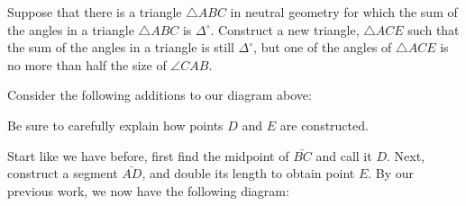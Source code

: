 \documentclass[instructornotes]{ximera}
\begin{document}
\begin{problem}\label{22} 
Suppose that there is a triangle $\triangle ABC$ in neutral geometry for
which the sum of the angles in a triangle $\triangle ABC$ is
$\Delta^\circ$. Construct a new triangle, $\triangle ACE$ such that
the sum of the angles in a triangle is still $\Delta^\circ$, but one
of the angles of $\triangle ACE$ is no more than half the size of
$\angle CAB$.
\begin{image}
\end{image}



\begin{hint} Consider the following additions to our diagram above:
\begin{image}
\end{image}
Be sure to carefully explain how points $D$ and $E$ are constructed.
\end{hint}
\begin{freeResponse}
Start like we have before, first find the midpoint of $\bar{BC}$ and
call it $D$. Next, construct a segment $\bar{AD}$, and double its
length to obtain point $E$. By our previous work, we now have the
following diagram:
\begin{image}
\end{image}
\end{freeResponse}
\end{problem}
\end{document}
